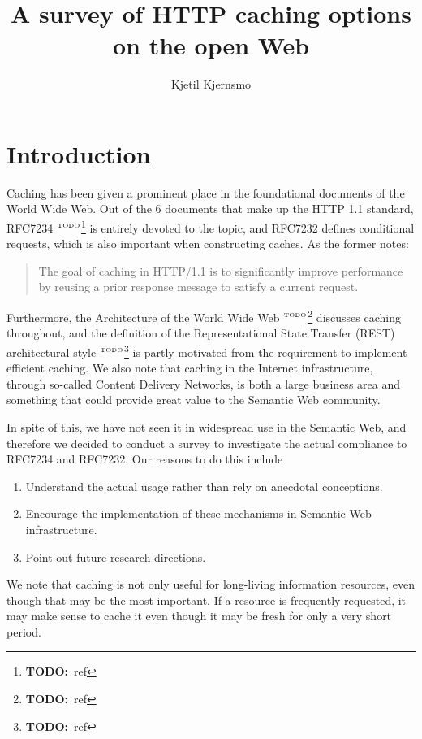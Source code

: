 \documentclass{article}
\title{A survey of HTTP caching options on the open Web}
\author{Kjetil Kjernsmo}%
\newcommand{\todo}[1]{\ensuremath{^{\textrm{\tiny{TODO}\normalsize}}}\footnote{\textbf{TODO:}~#1}}
\begin{document}
\maketitle

\begin{abstract}
\end{abstract}

\section{Introduction}

Caching has been given a prominent place in the foundational documents
of the World Wide Web. Out of the 6 documents that make up the HTTP
1.1 standard, RFC7234 \todo{ref} is entirely devoted to the topic, and
RFC7232 defines conditional requests, which is also important when
constructing caches. As the former notes:
\begin{quote} 
  The goal of caching in HTTP/1.1 is to significantly improve
  performance by reusing a prior response message to satisfy a current
  request.
\end{quote}
Furthermore, the Architecture of the World Wide Web \todo{ref}
discusses caching throughout, and the definition of the
Representational State Transfer (REST) architectural style \todo{ref}
is partly motivated from the requirement to implement efficient
caching. We also note that caching in the Internet infrastructure,
through so-called Content Delivery Networks, is both a large business
area and something that could provide great value to the Semantic Web
community.

In spite of this, we have not seen it in widespread use in the
Semantic Web, and therefore we decided to conduct a survey to
investigate the actual compliance to RFC7234 and RFC7232. Our reasons
to do this include
\begin{enumerate}
\item Understand the actual usage rather than rely on anecdotal
  conceptions.
\item Encourage the implementation of these mechanisms in Semantic Web
  infrastructure.
\item Point out future research directions.
\end{enumerate}

We note that caching is not only useful for long-living information
resources, even though that may be the most important. If a resource
is frequently requested, it may make sense to cache it even though it
may be fresh for only a very short period.
\end{document}
